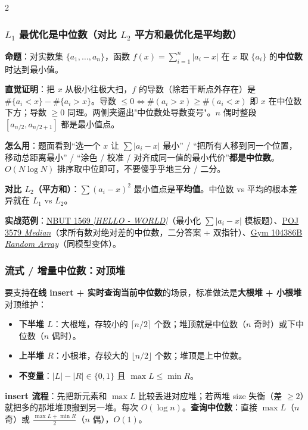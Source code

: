 \begin{multicols*}{2}
		\subsubsection{$L_1$ 最优化是中位数（对比 $L_2$ 平方和最优化是平均数）}

		\textbf{命题}：对实数集 $\{a_1, \ldots, a_n\}$，函数 $f(x) = \sum_{i=1}^{n} |a_i - x|$ 在 $x$ 取 $\{a_i\}$ 的\textbf{中位数}时达到最小值。

		\textbf{直觉证明}：把 $x$ 从极小往极大扫，$f$ 的导数（除若干断点外存在）是 $\#\{a_i < x\} - \#\{a_i > x\}$。导数 $\le 0 \Leftrightarrow \#(a_i > x) \ge \#(a_i < x)$ 即 $x$ 在中位数下方；导数 $\ge 0$ 同理。两侧夹逼出"中位数处导数变号"。$n$ 偶时整段 $[a_{n/2}, a_{n/2+1}]$ 都是最小值点。

		\textbf{怎么用}：题面看到\enquote{选一个 $x$ 让 $\sum|a_i-x|$ 最小} / \enquote{把所有人移到同一个位置，移动总距离最小} / \enquote{涂色 / 校准 / 对齐成同一值的最小代价}\textbf{都是中位数}。$O(N \log N)$ 排序取中位即可，不要傻乎乎地三分 / 二分。

		\textbf{对比 $L_2$（平方和）}：$\sum (a_i - x)^2$ 最小值点是\textbf{平均值}。中位数 vs 平均的根本差异就在 $L_1$ vs $L_2$。

		\textbf{实战范例}：\href{https://vjudge.net/problem/NBUT-1569}{NBUT 1569 \emph{|HELLO - WORLD|}}（最小化 $\sum |a_i - x|$ 模板题）、\href{https://vjudge.net/problem/POJ-3579}{POJ 3579 \emph{Median}}（求所有数对绝对差的中位数，二分答案 + 双指针）、\href{https://vjudge.net/problem/Gym-104386B}{Gym 104386B \emph{Random Array}}（同模型变体）。

		\subsubsection{流式 / 增量中位数：对顶堆}

		要支持\textbf{在线 insert + 实时查询当前中位数}的场景，标准做法是\textbf{大根堆 + 小根堆}对顶维护：

		\begin{itemize}
			\item \textbf{下半堆 $L$}：大根堆，存较小的 $\lceil n/2 \rceil$ 个数；堆顶就是中位数（$n$ 奇时）或下中位数（$n$ 偶时）。
			\item \textbf{上半堆 $R$}：小根堆，存较大的 $\lfloor n/2 \rfloor$ 个数；堆顶是上中位数。
			\item \textbf{不变量}：$|L| - |R| \in \{0, 1\}$ 且 $\max L \le \min R$。
		\end{itemize}

		\textbf{insert 流程}：先把新元素和 $\max L$ 比较丢进对应堆；若两堆 size 失衡（差 $\ge 2$）就把多的那堆堆顶搬到另一堆。每次 $O(\log n)$。\textbf{查询中位数}：直接 $\max L$（$n$ 奇）或 $\frac{\max L + \min R}{2}$（$n$ 偶），$O(1)$。


\end{multicols*}
